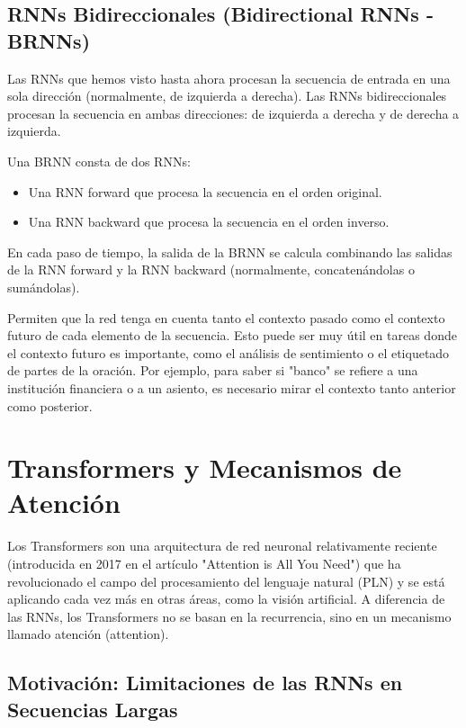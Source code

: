 \documentclass{article}
\begin{document}
\subsection{RNNs Bidireccionales (Bidirectional RNNs - BRNNs)}

Las RNNs que hemos visto hasta ahora procesan la secuencia de entrada en una sola dirección (normalmente, de izquierda a derecha).  Las RNNs bidireccionales procesan la secuencia en ambas direcciones: de izquierda a derecha y de derecha a izquierda.

Una BRNN consta de dos RNNs:

\begin{itemize}
    \item Una RNN forward que procesa la secuencia en el orden original.
    \item Una RNN backward que procesa la secuencia en el orden inverso.
\end{itemize}

En cada paso de tiempo, la salida de la BRNN se calcula combinando las salidas de la RNN forward y la RNN backward (normalmente, concatenándolas o sumándolas).

Permiten que la red tenga en cuenta tanto el contexto pasado como el contexto futuro de cada elemento de la secuencia.  Esto puede ser muy útil en tareas donde el contexto futuro es importante, como el análisis de sentimiento o el etiquetado de partes de la oración. Por ejemplo, para saber si "banco" se refiere a una institución financiera o a un asiento, es necesario mirar el contexto tanto anterior como posterior.

\section{Transformers y Mecanismos de Atención}

Los Transformers son una arquitectura de red neuronal relativamente reciente (introducida en 2017 en el artículo "Attention is All You Need") que ha revolucionado el campo del procesamiento del lenguaje natural (PLN) y se está aplicando cada vez más en otras áreas, como la visión artificial.  A diferencia de las RNNs, los Transformers no se basan en la recurrencia, sino en un mecanismo llamado atención (attention).

\subsection{Motivación: Limitaciones de las RNNs en Secuencias Largas}
\end{document}
